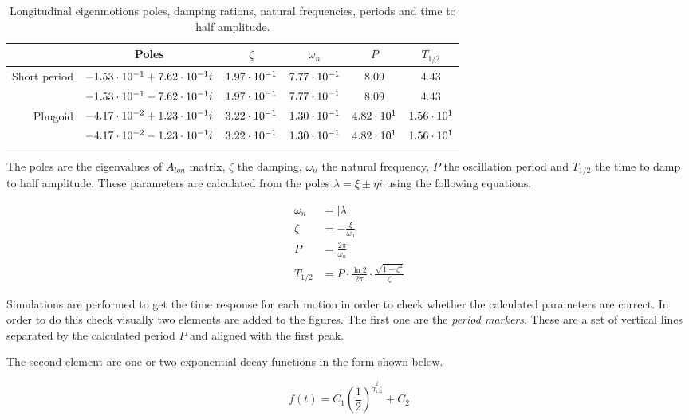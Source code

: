 \begin{table}[h!]
    \centering
    \begin{tabular}{ r | c c c c c }
                     & Poles                            & $\zeta$        & $\omega_n$     & $P$           & $T_{1/2}$     \\ \hline \hline
        Short period & $-1.53\cdot 10^{-1} + 7.62\cdot 10^{-1}i$ & $1.97\cdot 10^{-1}$ & $7.77\cdot 10^{-1}$ & $8.09$        & $4.43$        \\  
                     & $-1.53\cdot 10^{-1} - 7.62\cdot 10^{-1}i$ & $1.97\cdot 10^{-1}$ & $7.77\cdot 10^{-1}$ & $8.09$        & $4.43$        \\ \hline
        Phugoid      & $-4.17\cdot 10^{-2} + 1.23\cdot 10^{-1}i$ & $3.22\cdot 10^{-1}$ & $1.30\cdot 10^{-1}$ & $4.82\cdot 10^{1}$ & $1.56\cdot 10^{1}$ \\   
                     & $-4.17\cdot 10^{-2} - 1.23\cdot 10^{-1}i$ & $3.22\cdot 10^{-1}$ & $1.30\cdot 10^{-1}$ & $4.82\cdot 10^{1}$ & $1.56\cdot 10^{1}$
    \end{tabular}
    \caption{Longitudinal eigenmotions poles, damping rations, natural frequencies, periods and time to half amplitude.}
\end{table}

The poles are the eigenvalues of $A_{lon}$ matrix, $\zeta$ the damping, $\omega_n$ the natural frequency, $P$ the oscillation period and $T_{1/2}$ the time to damp to half amplitude. These parameters are calculated from the poles $\lambda =\xi \pm \eta i$ using the following equations.

\begin{align}
    \omega_n&=\left | \lambda\right | \\
    \zeta&=-\frac{\xi}{\omega_n} \\
    P&=\frac{2\pi}{\omega_n} \\
    T_{1/2}&=P \cdot \frac{\ln{2}}{2 \pi} \cdot \frac{\sqrt{1-\zeta^2}}{\zeta}
\end{align}

Simulations are performed to get the time response for each motion in order to check whether the calculated parameters are correct. In order to do this check visually two elements are added to the figures. The first one are the \emph{period markers}. These are a set of vertical lines separated by the calculated period $P$ and aligned with the first peak.

The second element are one or two exponential decay functions in the form shown below.

\begin{equation}
    f(t) = C_1\left(\frac{1}{2}\right)^{\frac{t}{T_{1/2}}} + C_2
\end{equation}

